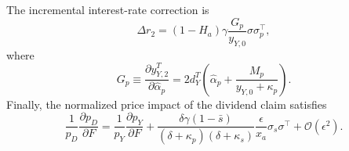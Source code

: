 \begin{prop}
    The incremental interest-rate correction is
    \begin{equation}
        \Delta r_2
        =(1-H_a)\gamma
        \frac{G_p}{y_{Y,0}}\sigma\sigma_p^\top,
    \end{equation}
    where
    \begin{equation}
        G_p
        \equiv
        \frac{\partial y_{Y,2}^T}{\partial \hat{\alpha}_p}
        =2d_Y^T\left(\hat{\alpha}_p+\frac{M_p}{y_{Y,0}+\kappa_p}\right).
    \end{equation}
    Finally, the normalized price impact of the dividend claim satisfies
    \begin{equation}
        \frac{1}{p_D}\frac{\partial p_D}{\partial F}
        =
        \frac{1}{p_Y}\frac{\partial p_Y}{\partial F}
        + \frac{\delta\gamma(1-\bar{s})}{(\delta+\kappa_p)(\delta+\kappa_s)}
        \frac{\epsilon}{x_a}\sigma_s\sigma^\top
        +\mathcal{O}(\epsilon^2).
    \end{equation}
\end{prop}

